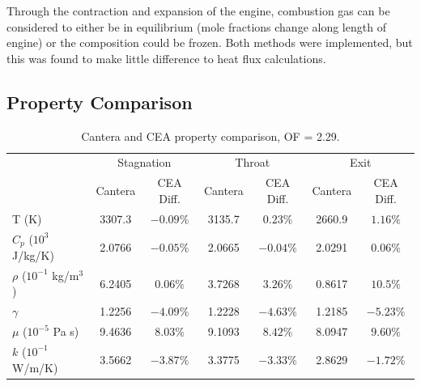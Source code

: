 \documentclass[11pt]{article}
\begin{document}
Through the contraction and expansion of the engine, combustion gas can be considered to either be in equilibrium (mole fractions change along length of engine) or the composition could be frozen. Both methods were implemented, but this was found to make little difference to heat flux calculations.


\subsection{Property Comparison}

\begin{table}[H]
  \centering
  \caption{Cantera and CEA property comparison, OF = 2.29.}
  \begin{tabular}{l c c c c c c}
    \toprule
    & \multicolumn{2}{c}{Stagnation} & \multicolumn{2}{c}{Throat} & \multicolumn{2}{c}{Exit} \\
    \cmidrule(lr){2-3} \cmidrule(lr){4-5} \cmidrule(lr){6-7}
    & Cantera & CEA Diff. & Cantera & CEA Diff. & Cantera & CEA Diff. \\
    \midrule
    T (K) & 3307.3 & $-0.09\%$ & 3135.7 & $0.23\%$ & 2660.9 & $1.16\%$ \\
    $C_p$ ($10^3$ J/kg/K) & 2.0766 & $-0.05\%$ & 2.0665 & $-0.04\%$ & 2.0291 & $0.06\%$ \\
    $\rho$ ($10^{-1}$ kg/m$^3$) & 6.2405 & $0.06\%$ & 3.7268 & $3.26\%$ & 0.8617 & $10.5\%$\\
    $\gamma$ & 1.2256 & $-4.09\%$ & 1.2228 & $-4.63\%$ & 1.2185 & $-5.23\%$ \\
    $\mu$ ($10^{-5}$ Pa s) & 9.4636 & $8.03\%$ & 9.1093 & $8.42\%$ & 8.0947 & $9.60\%$ \\
    $k$ ($10^{-1}$ W/m/K) & 3.5662 & $-3.87\%$ & 3.3775 & $-3.33\%$ & 2.8629 & $-1.72\%$\\
    \bottomrule
  \end{tabular}
\end{table}
\end{document}
